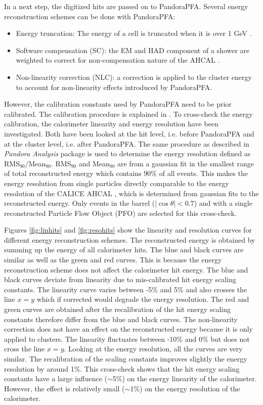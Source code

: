 In a next step, the digitized hits are passed on to PandoraPFA. Several energy reconstruction schemes can be done with PandoraPFA:
\begin{itemize}
  \item Energy truncation: The energy of a cell is truncated when it is over 1 GeV \cite{Tran:2017tgr}.
  \item Software compensation (SC): the EM and HAD component of a shower are weighted to correct for non-compensation nature of the AHCAL \cite{Tran:2017tgr}.
  \item Non-linearity correction (NLC): a correction is applied to the cluster energy to account for non-linearity effects introduced by PandoraPFA.
\end{itemize}
However, the calibration constants used by PandoraPFA need to be prior calibrated. The calibration procedure is explained in \cite{PandoraCalib}. To cross-check the energy calibration, the calorimeter linearity and energy resolution have been investigated. Both have been looked at the hit level, i.e. before PandoraPFA and at the cluster level, i.e. after PandoraPFA. The same procedure as described in \textit{Pandora Analysis} package is used to determine the energy resolution defined as RMS$_{90}$/Mean$_{90}$. RMS$_{90}$ and Mean$_{90}$ are from a gaussian fit in the smallest range of total reconstructed energy which contains 90\% of all events. This makes the energy resolution from single particles directly comparable to the energy resolution of the CALICE AHCAL \cite{Tran:2017tgr, SoftCompNew2012}, which is determined from gaussian fits to the reconstructed energy. Only events in the barrel ($|\cos\theta| < 0.7$) and with a single reconstructed Particle Flow Object (PFO) are selected for this cross-check.

Figures \ref{fig:linhits} and \ref{fig:resohits} show the linearity and resolution curves for different energy reconstruction schemes. The reconstructed energy is obtained by summing up the energy of all calorimeter hits. The blue and black curves are similar as well as the green and red curves. This is because the energy reconstruction scheme does not affect the calorimeter hit energy. The blue and black curves deviate from linearity due to mis-calibrated hit energy scaling constants. The linearity curve varies between -5\% and 5\% and also crosses the line $x=y$ which if corrected would degrade the energy resolution. The red and green curves are obtained after the recalibration of the hit energy scaling constants therefore differ from the blue and black curves. The non-linearity correction does not have an effect on the reconstructed energy because it is only applied to clusters. The linearity fluctuates between -10\% and 0\% but does not cross the line $x=y$. Looking at the energy resolution, all the curves are very similar. The recalibration of the scaling constants improves slightly the energy resolution by around 1\%. This cross-check shows that the hit energy scaling constants have a large influence ($\sim$5\%) on the energy linearity of the calorimeter. However, the effect is relatively small ($\sim$1\%) on the energy resolution of the calorimeter.

